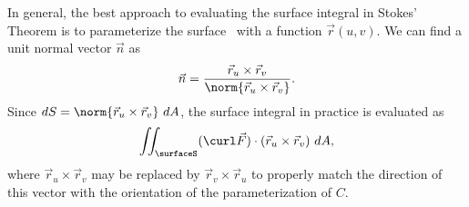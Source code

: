 In general, the best approach to evaluating the surface integral in Stokes' Theorem is to parameterize the surface \surfaceS\ with a function $\vec r(u,v)$. We can find a unit normal vector $\vec n$ as 
\[\vec n = \frac{\vec r_u\times\vec r_v}{\norm{\vec r_u\times\vec r_v}}.\]
Since $dS = \norm{\vec r_u\times\vec r_v}\ dA$, the surface integral in practice is evaluated as 
\[\iint_\surfaceS (\curl \vec F)\cdot (\vec r_u\times\vec r_v)\ dA,\]
where $\vec r_u\times\vec r_v$ may be replaced by $\vec r_v\times\vec r_u$ to properly match the direction of this vector with the orientation of the parameterization of $C$.



